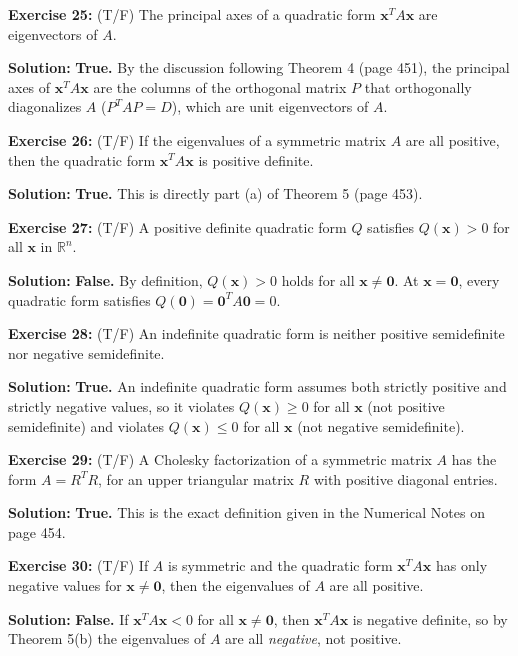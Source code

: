 \documentclass[11pt, letterpaper]{article}
\theoremstyle{definition}
\theoremstyle{remark}
\begin{document}
\medskip
\textbf{Exercise 25:} (T/F) The principal axes of a quadratic form $\mathbf{x}^T A \mathbf{x}$ are eigenvectors of $A$.

\textbf{Solution:} \textbf{True.} By the discussion following Theorem 4 (page 451), the principal axes of $\mathbf{x}^T A \mathbf{x}$ are the columns of the orthogonal matrix $P$ that orthogonally diagonalizes $A$ ($P^T A P = D$), which are unit eigenvectors of $A$.

\medskip
\textbf{Exercise 26:} (T/F) If the eigenvalues of a symmetric matrix $A$ are all positive, then the quadratic form $\mathbf{x}^T A \mathbf{x}$ is positive definite.

\textbf{Solution:} \textbf{True.} This is directly part (a) of Theorem 5 (page 453).

\medskip
\textbf{Exercise 27:} (T/F) A positive definite quadratic form $Q$ satisfies $Q(\mathbf{x}) > 0$ for all $\mathbf{x}$ in $\mathbb{R}^n$.

\textbf{Solution:} \textbf{False.} By definition, $Q(\mathbf{x}) > 0$ holds for all $\mathbf{x} \neq \mathbf{0}$. At $\mathbf{x} = \mathbf{0}$, every quadratic form satisfies $Q(\mathbf{0}) = \mathbf{0}^T A \mathbf{0} = 0$.

\medskip
\textbf{Exercise 28:} (T/F) An indefinite quadratic form is neither positive semidefinite nor negative semidefinite.

\textbf{Solution:} \textbf{True.} An indefinite quadratic form assumes both strictly positive and strictly negative values, so it violates $Q(\mathbf{x}) \ge 0$ for all $\mathbf{x}$ (not positive semidefinite) and violates $Q(\mathbf{x}) \le 0$ for all $\mathbf{x}$ (not negative semidefinite).

\medskip
\textbf{Exercise 29:} (T/F) A Cholesky factorization of a symmetric matrix $A$ has the form $A = R^T R$, for an upper triangular matrix $R$ with positive diagonal entries.

\textbf{Solution:} \textbf{True.} This is the exact definition given in the Numerical Notes on page 454.

\medskip
\textbf{Exercise 30:} (T/F) If $A$ is symmetric and the quadratic form $\mathbf{x}^T A \mathbf{x}$ has only negative values for $\mathbf{x} \neq \mathbf{0}$, then the eigenvalues of $A$ are all positive.

\textbf{Solution:} \textbf{False.} If $\mathbf{x}^T A \mathbf{x} < 0$ for all $\mathbf{x} \neq \mathbf{0}$, then $\mathbf{x}^T A \mathbf{x}$ is negative definite, so by Theorem 5(b) the eigenvalues of $A$ are all \textit{negative}, not positive.
\end{document}
